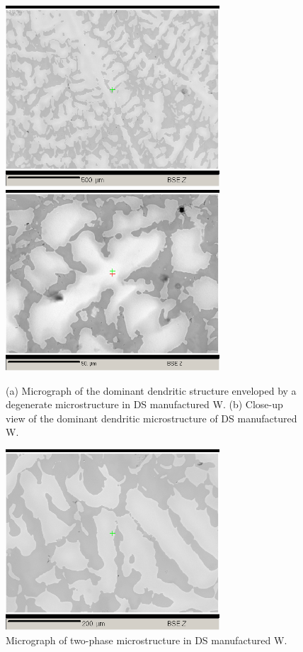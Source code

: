 %
\begin{figure}[htbp]
\begin{center}
\includegraphics[width=8cm]{sanW_RF_auto3_b}
\includegraphics[width=8cm]{sanWi}
\caption{(a) Micrograph of the dominant dendritic structure enveloped by a degenerate microstructure in DS manufactured W.  (b) Close-up view of the dominant dendritic microstructure of DS manufactured W.}\label{fig:sanWi}
\end{center}
\end{figure}
%
%
\begin{figure}[htbp]
\begin{center}
\includegraphics[width=8cm]{sanW_RF_auto3a}
\caption{Micrograph of two-phase microstructure in DS manufactured W.}\label{fig:sanWii}
\end{center}
\end{figure}
